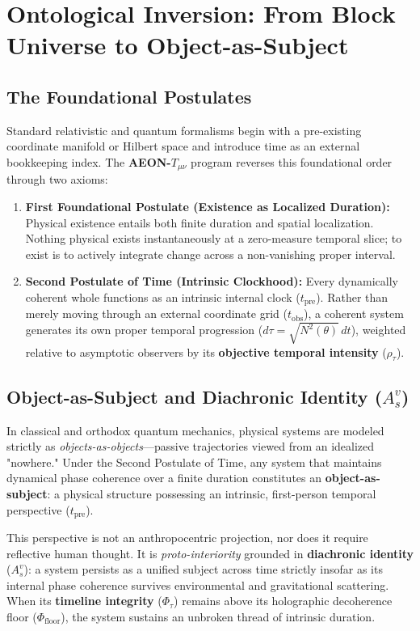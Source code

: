 \documentclass[11pt,a4paper]{article}
\begin{document}
\tableofcontents
\newpage

\section{Ontological Inversion: From Block Universe to Object-as-Subject}

\subsection{The Foundational Postulates}
Standard relativistic and quantum formalisms begin with a pre-existing coordinate manifold or Hilbert space and introduce time as an external bookkeeping index. The \textbf{AEON-$T_{\mu\nu}$} program reverses this foundational order through two axioms:
\begin{enumerate}[leftmargin=1.5em]
    \item \textbf{First Foundational Postulate (Existence as Localized Duration):} Physical existence entails both finite duration and spatial localization. Nothing physical exists instantaneously at a zero-measure temporal slice; to exist is to actively integrate change across a non-vanishing proper interval.
    \item \textbf{Second Postulate of Time (Intrinsic Clockhood):} Every dynamically coherent whole functions as an intrinsic internal clock ($t_{\text{pre}}$). Rather than merely moving through an external coordinate grid ($t_{\text{obs}}$), a coherent system generates its own proper temporal progression ($d\tau = \sqrt{N^2(\theta)}\,dt$), weighted relative to asymptotic observers by its \textbf{objective temporal intensity} ($\rho_\tau$).
\end{enumerate}

\subsection{Object-as-Subject and Diachronic Identity ($A_s^v$)}
In classical and orthodox quantum mechanics, physical systems are modeled strictly as \textit{objects-as-objects}---passive trajectories viewed from an idealized "nowhere." Under the Second Postulate of Time, any system that maintains dynamical phase coherence over a finite duration constitutes an \textbf{object-as-subject}: a physical structure possessing an intrinsic, first-person temporal perspective ($t_{\text{pre}}$).

This perspective is not an anthropocentric projection, nor does it require reflective human thought. It is \textit{proto-interiority} grounded in \textbf{diachronic identity} ($A_s^v$): a system persists as a unified subject across time strictly insofar as its internal phase coherence survives environmental and gravitational scattering. When its \textbf{timeline integrity} ($\Phi_\tau$) remains above its holographic decoherence floor ($\Phi_{\text{floor}}$), the system sustains an unbroken thread of intrinsic duration.
\end{document}
